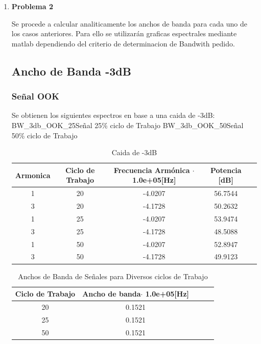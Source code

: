 \documentclass[letterpaper, titlepage]{article}
\begin{document}
\begin{enumerate}
	\newpage
		\item \textbf{Problema 2}
		
		Se procede a calcular analiticamente los anchos de banda para cada uno de los casos anteriores. Para ello se utilizarán graficas espectrales mediante matlab dependiendo del criterio de determinacion de Bandwith pedido.
		\subsection{Ancho de Banda -3dB}
			\subsubsection{Señal OOK}
		Se obtienen los siguientes espectros en base a una caida de -3dB:\\
			 {BW_3db_OOK_25}{\label{fig:sim}}{Señal 25\% ciclo de Trabajo}
			 {BW_3db_OOK_50}{\label{fig:sim}}{Señal 50\% ciclo de Trabajo}\\
			\begin{table}[ht]
			\centering
			\begin{tabular}{c c c c c}
				Armonica & Ciclo de Trabajo & Frecuencia Armónica $\cdot$ 1.0e+05[Hz] & Potencia [dB]\\
				\hline
				1 & 20 & -4.0207 & 56.7544  \\
				3 & 20 & -4.1728 & 50.2632	\\
				1 & 25 & -4.0207 & 53.9474   \\
				3 & 25 & -4.1728 & 48.5088   \\
				1 & 50 & -4.0207 & 52.8947  \\
				3 & 50 & -4.1728 & 49.9123   \\
			\end{tabular}
			\caption{Caida de -3dB}
			\label{tab:tabla1}
		\end{table}	
		
		\begin{table}[ht]
			\centering
			\begin{tabular}{c c c c c}
				Ciclo de Trabajo & Ancho de banda$\cdot$ 1.0e+05[Hz] \\
				\hline
				20 & 0.1521   \\
				25 & 0.1521  \\
				50 & 0.1521   \\
			\end{tabular}
			\caption{Anchos de Banda de Señales para Diversos ciclos de Trabajo}
			\label{tab:tabla1}
		\end{table}
				

\end{enumerate}
\end{document}
